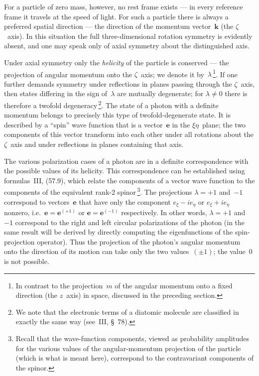 For a particle of zero mass, however, no rest frame exists --- in every reference frame it travels at the speed of light. For such a particle there is always a preferred spatial direction --- the direction of the momentum vector~$\mathbf{k}$ (the $\zeta$~axis). In this situation the full three-dimensional rotation symmetry is evidently absent, and one may speak only of axial symmetry about the distinguished axis.

Under axial symmetry only the \emph{helicity} of the particle is conserved --- the projection of angular momentum onto the $\zeta$~axis; we denote it by~$\lambda$\,\footnote{In contrast to the projection~$m$ of the angular momentum onto a fixed direction (the $z$~axis) in space, discussed in the preceding section.}. If one further demands symmetry under reflections in planes passing through the $\zeta$~axis, then states differing in the sign of~$\lambda$ are mutually degenerate; for $\lambda \neq 0$ there is therefore a twofold degeneracy\,\footnote{We note that the electronic terms of a diatomic molecule are classified in exactly the same way (see~III, \S~78).}. The state of a photon with a definite momentum belongs to precisely this type of twofold-degenerate state. It is described by a ``spin'' wave function that is a vector~$\mathbf{e}$ in the $\xi\eta$~plane; the two components of this vector transform into each other under all rotations about the $\zeta$~axis and under reflections in planes containing that axis.

The various polarization cases of a photon are in a definite correspondence with the possible values of its helicity. This correspondence can be established using formulas~III, (57.9), which relate the components of a vector wave function to the components of the equivalent rank-2 spinor\,\footnote{Recall that the wave-function components, viewed as probability amplitudes for the various values of the angular-momentum projection of the particle (which is what is meant here), correspond to the contravariant components of the spinor.}. The projections $\lambda = +1$ and~$-1$ correspond to vectors~$\mathbf{e}$ that have only the component $e_\xi - ie_\eta$ or $e_\xi + ie_\eta$ nonzero, i.e.\ $\mathbf{e} = \mathbf{e}^{(+1)}$ or $\mathbf{e} = \mathbf{e}^{(-1)}$ respectively. In other words, $\lambda = +1$ and~$-1$ correspond to the right and left circular polarizations of the photon (in  the same result will be derived by directly computing the eigenfunctions of the spin-projection operator). Thus the projection of the photon's angular momentum onto the direction of its motion can take only the two values~$(\pm 1)$; the value~0 is not possible.

